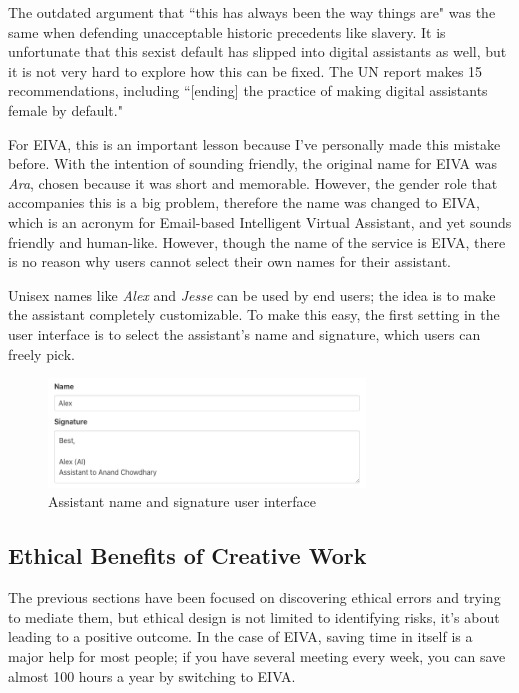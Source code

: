 \documentclass{article}
\begin{document}
The outdated argument that ``this has always been the way things are" was the same when defending unacceptable historic precedents like slavery. It is unfortunate that this sexist default has slipped into digital assistants as well, but it is not very hard to explore how this can be fixed. The UN report makes 15 recommendations, including ``[ending] the practice of making digital assistants female by default."

For EIVA, this is an important lesson because I've personally made this mistake before. With the intention of sounding friendly, the original name for EIVA was \emph{Ara}, chosen because it was short and memorable. However, the gender role that accompanies this is a big problem, therefore the name was changed to EIVA, which is an acronym for Email-based Intelligent Virtual Assistant, and yet sounds friendly and human-like. However, though the name of the service is EIVA, there is no reason why users cannot select their own names for their assistant.

Unisex names like \emph{Alex} and \emph{Jesse} can be used by end users; the idea is to make the assistant completely customizable. To make this easy, the first setting in the user interface is to select the assistant's name and signature, which users can freely pick.


\begin{figure}[h]
 \centering
 \includegraphics[width=0.75\textwidth]{name.png}
 \caption{Assistant name and signature user interface}
 \label{fig:checkbox}
\end{figure}

\subsection{Ethical Benefits of Creative Work}

The previous sections have been focused on discovering ethical errors and trying to mediate them, but ethical design is not limited to identifying risks, it's about leading to a positive outcome. In the case of EIVA, saving time in itself is a major help for most people; if you have several meeting every week, you can save almost 100 hours a year by switching to EIVA.
\end{document}
